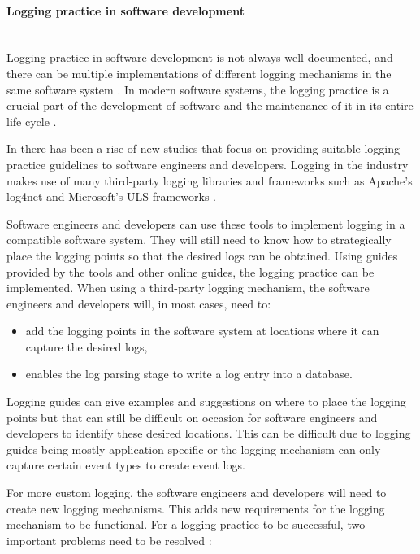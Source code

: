 \paragraph{Logging practice in software development}\label{sec:ch1_loggingPractice}\leavevmode\\
Logging practice in software development is not always well documented, and there can be multiple implementations of different logging mechanisms in the same software system \cite{Pecchia2015, Kitchenham2007}. In modern software systems, the logging practice is a crucial part of the development of software and the maintenance of it in its entire life cycle \cite{Rong2018}.\par In  there has been a rise of new studies that focus on providing suitable logging practice guidelines to software engineers and developers. Logging in the industry makes use of many third-party logging libraries and frameworks such as Apache's log4net and Microsoft's ULS frameworks \cite{Zhu2015, Rong2018}.\par Software engineers and developers can use these tools to implement logging in a compatible software system. They will still need to know how to strategically place the logging points so that the desired logs can be obtained. Using guides provided by the tools and other online guides, the logging practice can be implemented. When using a third-party logging mechanism, the software engineers and developers will, in most cases, need to:

\begin{itemize}
	\item add the logging points in the software system at locations where it can capture the desired logs,
	\item enables the log parsing stage to write a log entry into a database.
\end{itemize}

Logging guides can give examples and suggestions on where to place the logging points but that can still be difficult on occasion for software engineers and developers to identify these desired locations. This can be difficult due to logging guides being mostly application-specific or the logging mechanism can only capture certain event types to create event logs. \par For more custom logging, the software engineers and developers will need to create new logging mechanisms. This adds new requirements for the logging mechanism to be functional. For a logging practice to be successful, two important problems need to be resolved \cite{Zhu2015, Zhu2019, Rong2018}:

